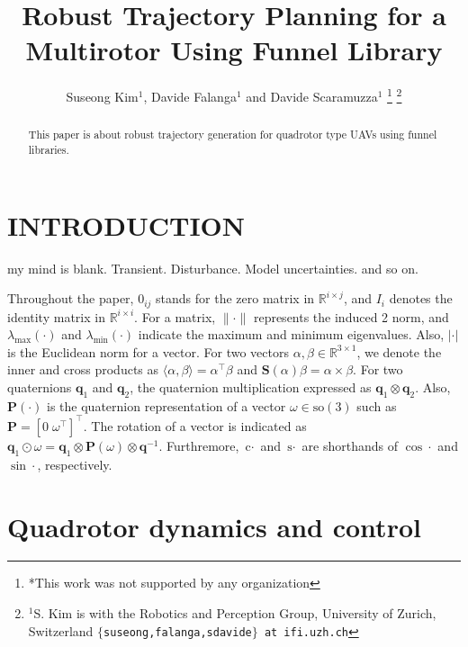 \documentclass[letterpaper, 10 pt, conference]{ieeeconf}  %
\title{\LARGE \bf
Robust Trajectory Planning for a Multirotor Using Funnel Library
}
\author{Suseong Kim$^{1}$, Davide Falanga$^{1}$ and Davide Scaramuzza$^{1}$%
\thanks{*This work was not supported by any organization}%
\thanks{$^{1}$S. Kim is with the Robotics and Perception Group, University of Zurich, Switzerland
        {\tt\small $\{$suseong,falanga,sdavide$\}$ at ifi.uzh.ch}}%
}
\begin{document}
\maketitle
\thispagestyle{empty}
\pagestyle{empty}


\begin{abstract}

This paper is about robust trajectory generation for quadrotor type UAVs using funnel libraries.

\end{abstract}


\section{INTRODUCTION}

my mind is blank.
Transient. Disturbance. Model uncertainties. and so on.

Throughout the paper, $0_{ij}$ stands for the zero matrix in $\mathbb{R}^{i\times j}$, and $I_i$ denotes the identity matrix in $\mathbb{R}^{i\times i}$. 
For a matrix, $\|\cdot\|$ represents the induced 2 norm, and $\lambda_{\max}(\cdot)$ and $\lambda_{\min}(\cdot)$ indicate the maximum and minimum eigenvalues.
Also, $|\cdot|$ is the Euclidean norm for a vector. 
For two vectors $\alpha,\beta \in \mathbb{R}^{3\times 1}$, 
we denote the inner and cross products as $\langle \alpha,\beta\rangle = \alpha^\top \beta$ and $\textbf{S}(\alpha)\beta = \alpha \times \beta$. 
For two quaternions $\mathbf{q}_1$ and $\mathbf{q}_2$, the quaternion multiplication expressed as $\mathbf{q}_1\otimes\mathbf{q}_2$. 
Also, $\textbf{P}(\cdot)$ is the quaternion representation of a vector $\omega\in\text{so}(3)$ such as $\textbf{P} = [0\;\omega^\top]^\top$. 
The rotation of a vector is indicated as $\mathbf{q}_1\odot\omega = \textbf{q}_1\otimes\textbf{P}(\omega)\otimes\textbf{q}^{-1}$. 
Furthremore, $\text{c}\cdot$ and $\text{s}\cdot$ are shorthands of $\cos\cdot$ and $\sin\cdot$, respectively.

\section{Quadrotor dynamics and control}
\end{document}
